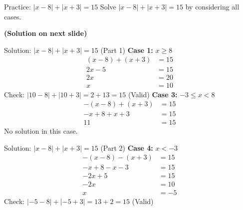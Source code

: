 \documentclass[aspectratio=169]{beamer}
\begin{document}
\begin{frame}{Practice: $|x-8| + |x+3| = 15$}
    \footnotesize
    Solve $|x-8| + |x+3| = 15$ by considering all cases.\par
    \textbf{(Solution on next slide)}
\end{frame}

\begin{frame}{Solution: $|x-8| + |x+3| = 15$ (Part 1)}
    \footnotesize
    \textbf{Case 1:} $x \geq 8$
    \begin{align*}
        (x-8) + (x+3) &= 15 \\
        2x - 5 &= 15 \\
        2x &= 20 \\
        x &= 10
    \end{align*}
    Check: $|10-8| + |10+3| = 2 + 13 = 15$ (Valid)
    \vspace{1em}
    \textbf{Case 3:} $-3 \leq x < 8$
    \begin{align*}
        -(x-8) + (x+3) &= 15 \\
        -x+8+x+3 &= 15 \\
        11 &= 15
    \end{align*}
    No solution in this case.
\end{frame}

\begin{frame}{Solution: $|x-8| + |x+3| = 15$ (Part 2)}
    \footnotesize
    \textbf{Case 4:} $x < -3$
    \begin{align*}
        -(x-8) - (x+3) &= 15 \\
        -x+8-x-3 &= 15 \\
        -2x+5 &= 15 \\
        -2x &= 10 \\
        x &= -5
    \end{align*}
    Check: $|-5-8| + |-5+3| = 13 + 2 = 15$ (Valid)
\end{frame}
\end{document}

